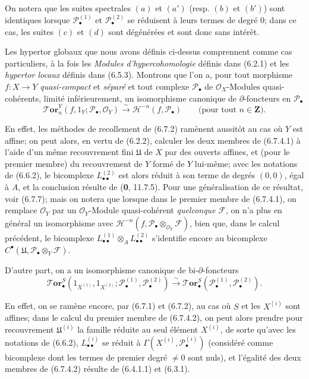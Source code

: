 On notera que les suites spectrales $(a)$ et $(a')$ (resp. $(b)$ et $(b')$)
sont identiques lorsque $\mathscr P_\bullet^{(1)}$ et
$\mathscr P_\bullet^{(2)}$ se réduisent à leurs termes de degré 0; dans ce cas,
les suites $(c)$ et $(d)$ sont dégénérées et sont donc sans intérêt.

\begin{remark}[6.7.4]
Les hypertor globaux que nous avons définis ci-dessus comprennent comme cas
particuliers, à la fois les \emph{Modules d'hypercohomologie} définis dans
(6.2.1) et les \emph{hypertor locaux} définis dans (6.5.3). Montrons que l'on
a, pour tout morphisme $f:X\to Y$ \emph{quasi-compact} et \emph{séparé} et tout
complexe $\mathscr P_\bullet$ de $\mathscr O_X$-Modules quasi-cohérents,
limité inférieurement, un isomorphisme canonique de $\partial$-foncteurs en
$\mathscr P_\bullet$
\[
  \boldsymbol{\mathscr{T}\!or}_n^Y(f,1_Y;\mathscr P_\bullet,\mathscr O_Y)
  \xrightarrow{\sim}
  \mathcal H^{-n}(f,\mathscr P_\bullet)
  \qquad\text{(pour tout $n\in\mathbf Z$)}.
  \tag{6.7.4.1}\label{III.6.7.4.1.fr}
\]

En effet, les méthodes de recollement de (6.7.2) ramènent aussitôt au cas où
$Y$ est affine; on peut alors, en vertu de (6.2.2), calculer les deux membres
de (6.7.4.1) à l'aide d'un même recouvrement fini $\mathfrak U$ de $X$ par des
ouverts affines, et (pour le premier membre) du recouvrement de $Y$ formé de
$Y$ lui-même; avec les notations de (6.6.2), le bicomplexe
$L_{\bullet\bullet}^{(2)}$ est alors réduit à son terme de degrés $(0,0)$,
égal à $A$, et la conclusion résulte de (\textbf{0}, 11.7.5). Pour une
généralisation de ce résultat, voir (6.7.7); mais on notera que lorsque dans
le premier membre de (6.7.4.1), on remplace $\mathscr O_Y$ par un
$\mathscr O_Y$-Module quasi-cohérent \emph{quelconque} $\mathscr F$, on n'a
plus en général un isomorphisme avec
$\mathcal H^{-n}(f,\mathscr P_\bullet\otimes_{\mathscr O_Y}\mathscr F)$, bien
que, dans le calcul précédent, le bicomplexe
$L_{\bullet\bullet}^{(1)}\otimes_A L_{\bullet\bullet}^{(2)}$ s'identifie
encore au bicomplexe
$C^\bullet(\mathfrak U,\mathscr P_\bullet\otimes_Y\mathscr F)$.

D'autre part, on a un isomorphisme canonique de bi-$\partial$-foncteurs
\[
  \boldsymbol{\mathscr{T}\!or}_\bullet^S
  (1_{X^{(1)}},1_{X^{(2)}};
   \mathscr P_\bullet^{(1)},\mathscr P_\bullet^{(2)})
  \xrightarrow{\sim}
  \boldsymbol{\mathscr{T}\!or}_\bullet^S
  (\mathscr P_\bullet^{(1)},\mathscr P_\bullet^{(2)}).
  \tag{6.7.4.2}\label{III.6.7.4.2.fr}
\]

En effet, on se ramène encore, par (6.7.1) et (6.7.2), au cas où $S$ et les
$X^{(i)}$ sont affines; dans le calcul du premier membre de (6.7.4.2), on peut
alors prendre pour
recouvrement $\mathfrak U^{(i)}$ la famille réduite au seul élément $X^{(i)}$,
de sorte qu'avec les notations de (6.6.2), $L_{\bullet\bullet}^{(i)}$ se réduit
à $\Gamma(X^{(i)},\mathscr P_\bullet^{(i)})$ (considéré comme bicomplexe dont
les termes de premier degré $\ne0$ sont nuls), et l'égalité des deux membres
de (6.7.4.2) résulte de (6.4.1.1) et (6.3.1).
\end{remark}

